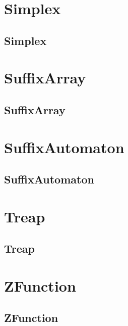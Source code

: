 \documentclass[a4paper, twocolumn]{article}
\begin{document}
\section{Simplex}
\subsection{Simplex}

\section{SuffixArray}
\subsection{SuffixArray}

\section{SuffixAutomaton}
\subsection{SuffixAutomaton}

\section{Treap}
\subsection{Treap}

\section{ZFunction}
\subsection{ZFunction}

\end{document}
